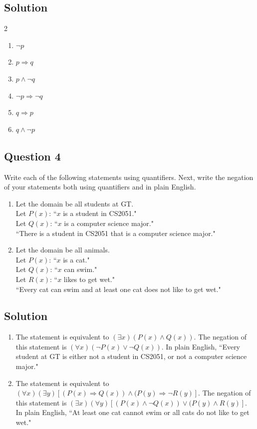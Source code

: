 \documentclass{article}
\begin{document}
\subsection*{Solution}
    \begin{multicols}{2}
    \begin{enumerate}
        \item $\neg p$
        \item $p \Rightarrow q$
        \item $p \land \neg q$
        \item $\neg p \Rightarrow \neg q$
        \item $q \Rightarrow p$
        \item $q \land \neg p$
    \end{enumerate}
    \end{multicols}

\subsection*{Question 4}
    Write each of the following statements using quantifiers. Next, write the negation of your statements both using quantifiers and in plain English.
    \begin{enumerate}
        \item Let the domain be all students at GT. \\
        Let $P(x)$: ``$x$ is a student in CS2051." \\
        Let $Q(x)$: ``$x$ is a computer science major."  \\
        ``There is a student in CS2051 that is a computer science major."
        \item Let the domain be all animals. \\
        Let $P(x)$: ``$x$ is a cat." \\
        Let $Q(x)$: ``$x$ can swim." \\
        Let $R(x)$: ``$x$ likes to get wet." \\
        ``Every cat can swim and at least one cat does not like to get wet."
    \end{enumerate}

\subsection*{Solution}
    \begin{enumerate}
        \item The statement is equivalent to $(\exists x)(P(x) \land Q(x))$. The negation of this statement is $(\forall x)(\neg P(x) \lor \neg Q(x))$. In plain English, ``Every student at GT is either not a student in CS2051, or not a computer science major."
        \item The statement is equivalent to $(\forall x)(\exists y)[(P(x) \Rightarrow Q(x)) \land (P(y) \Rightarrow \neg R(y)]$. The negation of this statement is $(\exists x)(\forall y)[(P(x) \land \neg Q(x)) \lor (P(y) \land R(y)]$. In plain English, ``At least one cat cannot swim or all cats do not like to get wet."
    \end{enumerate}
\end{document}
